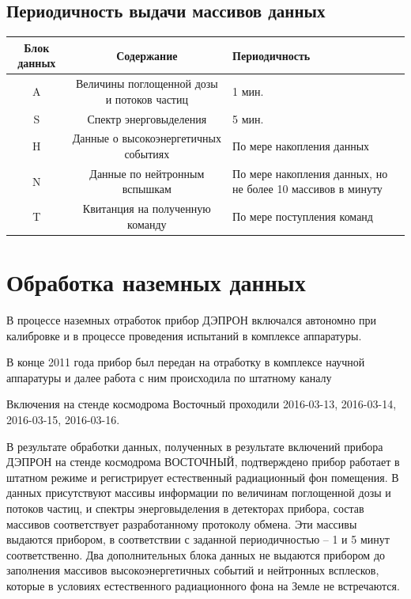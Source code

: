 \subsection{Периодичность выдачи массивов данных}
\begin{center}
	{\small 
		\begin{tabularx}{\textwidth}{|c|c|X|}
			\hline
			Блок данных & Содержание                                 & Периодичность \\ \hline
			     A      & Величины поглощенной дозы и потоков частиц & 1 мин. \\ \hline
			     S      & Спектр энерговыделения                     & 5 мин. \\ \hline
			     H      & Данные о высокоэнергетичных событиях       & По мере накопления данных \\ \hline
			     N      & Данные по нейтронным вспышкам              &  По мере накопления данных, но не более 10 массивов в минуту\\ \hline
			     T      & Квитанция на полученную команду            &  По мере поступления команд\\ \hline
		\end{tabularx}
}
\end{center}



\section{Обработка наземных данных}\label{sec3.2.1}
В процессе наземных отработок прибор ДЭПРОН включался автономно при калибровке и в процессе проведения испытаний в комплексе аппаратуры.


В конце 2011 года прибор был передан на отработку в комплексе научной аппаратуры и далее работа с ним происходила по штатному каналу

Включения на стенде космодрома Восточный проходили  
2016-03-13,
2016-03-14,
2016-03-15,
2016-03-16.


В результате обработки данных, полученных в результате включений прибора ДЭПРОН на стенде космодрома ВОСТОЧНЫЙ, подтверждено прибор работает в штатном режиме и регистрирует естественный радиационный фон помещения.
В данных присутствуют массивы информации по величинам поглощенной дозы и потоков частиц, и спектры энерговыделения в детекторах прибора, состав массивов соответствует разработанному протоколу обмена. Эти массивы выдаются прибором, в соответствии с заданной периодичностью – 1 и 5 минут соответственно. Два дополнительных блока данных не выдаются прибором до заполнения массивов высокоэнергетичных событий и нейтронных всплесков, которые в условиях естественного радиационного фона на Земле не встречаются.

